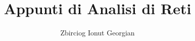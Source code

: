 \documentclass[a4paper,12pt]{report}
\begin{document}
\title{Appunti di Analisi di Reti}
\author{Zbirciog Ionut Georgian}
\maketitle
 
\setcounter{tocdepth}{3}
\setcounter{secnumdepth}{3}
\tableofcontents





\end{document}
